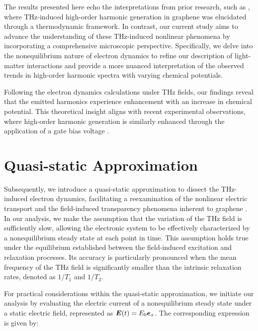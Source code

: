 The results presented here echo the interpretations from prior research, such as \cite{mics2015thermodynamic}, where THz-induced high-order harmonic generation in graphene was elucidated through a thermodynamic framework. In contrast, our current study aims to advance the understanding of these THz-induced nonlinear phenomena by incorporating a comprehensive microscopic perspective. Specifically, we delve into the nonequilibrium nature of electron dynamics to refine our description of light-matter interactions and provide a more nuanced interpretation of the observed trends in high-order harmonic spectra with varying chemical potentials.

Following the electron dynamics calculations under THz fields, our findings reveal that the emitted harmonics experience enhancement with an increase in chemical potential. This theoretical insight aligns with recent experimental observations, where high-order harmonic generation is similarly enhanced through the application of a gate bias voltage \cite{kovalev2021electrical}.
\section{Quasi-static Approximation}
 Subsequently, we introduce a quasi-static approximation to dissect the THz-induced electron dynamics, facilitating a reexamination of the nonlinear electric transport and the field-induced transparency phenomena inherent to graphene \cite{sato2021nonlinear}.
 In our analysis, we make the assumption that the variation of the THz field is sufficiently slow, allowing the electronic system to be effectively characterized by a nonequilibrium steady state at each point in time. This assumption holds true under the equilibrium established between the field-induced excitation and relaxation processes. Its accuracy is particularly pronounced when the mean frequency of the THz field is significantly smaller than the intrinsic relaxation rates, denoted as $1/T_1$ and $1/T_2$.

For practical considerations within the quasi-static approximation, we initiate our analysis by evaluating the electric current of a nonequilibrium steady state under a static electric field, represented as $\boldsymbol E(t)=E_0 \boldsymbol e_x$. The corresponding expression is given by:

